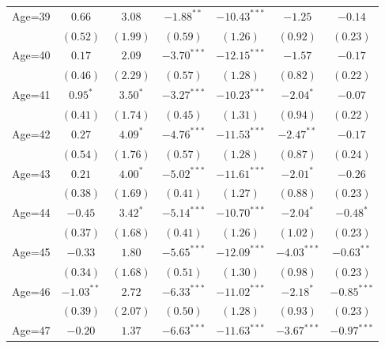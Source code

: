 \documentclass[fullpage]{paper}
\begin{document}
\begin{center}
\begin{longtable}{l c c c c c c }
Age=39      & $0.66$        & $3.08$        & $-1.88^{**}$   & $-10.43^{***}$ & $-1.25$       & $-0.14$       \\
            & $(0.52)$      & $(1.99)$      & $(0.59)$       & $(1.26)$       & $(0.92)$      & $(0.23)$      \\
Age=40      & $0.17$        & $2.09$        & $-3.70^{***}$  & $-12.15^{***}$ & $-1.57$       & $-0.17$       \\
            & $(0.46)$      & $(2.29)$      & $(0.57)$       & $(1.28)$       & $(0.82)$      & $(0.22)$      \\
Age=41      & $0.95^{*}$    & $3.50^{*}$    & $-3.27^{***}$  & $-10.23^{***}$ & $-2.04^{*}$   & $-0.07$       \\
            & $(0.41)$      & $(1.74)$      & $(0.45)$       & $(1.31)$       & $(0.94)$      & $(0.22)$      \\
Age=42      & $0.27$        & $4.09^{*}$    & $-4.76^{***}$  & $-11.53^{***}$ & $-2.47^{**}$  & $-0.17$       \\
            & $(0.54)$      & $(1.76)$      & $(0.57)$       & $(1.28)$       & $(0.87)$      & $(0.24)$      \\
Age=43      & $0.21$        & $4.00^{*}$    & $-5.02^{***}$  & $-11.61^{***}$ & $-2.01^{*}$   & $-0.26$       \\
            & $(0.38)$      & $(1.69)$      & $(0.41)$       & $(1.27)$       & $(0.88)$      & $(0.23)$      \\
Age=44      & $-0.45$       & $3.42^{*}$    & $-5.14^{***}$  & $-10.70^{***}$ & $-2.04^{*}$   & $-0.48^{*}$   \\
            & $(0.37)$      & $(1.68)$      & $(0.41)$       & $(1.26)$       & $(1.02)$      & $(0.23)$      \\
Age=45      & $-0.33$       & $1.80$        & $-5.65^{***}$  & $-12.09^{***}$ & $-4.03^{***}$ & $-0.63^{**}$  \\
            & $(0.34)$      & $(1.68)$      & $(0.51)$       & $(1.30)$       & $(0.98)$      & $(0.23)$      \\
Age=46      & $-1.03^{**}$  & $2.72$        & $-6.33^{***}$  & $-11.02^{***}$ & $-2.18^{*}$   & $-0.85^{***}$ \\
            & $(0.39)$      & $(2.07)$      & $(0.50)$       & $(1.28)$       & $(0.93)$      & $(0.23)$      \\
Age=47      & $-0.20$       & $1.37$        & $-6.63^{***}$  & $-11.63^{***}$ & $-3.67^{***}$ & $-0.97^{***}$ \\

\end{longtable}
\end{center}
\end{document}
